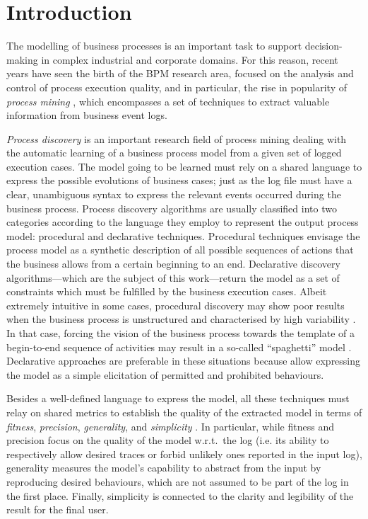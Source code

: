 
\section{Introduction}
\label{sec:intro}
The modelling of business processes is an important task to support decision-making in complex industrial and corporate domains. For this reason, recent years have seen the birth of the \ac{BPM} research area, focused on the analysis and control of process execution quality, and in particular, the rise in popularity of \emph{process mining} \cite{2012-Aalst}, which encompasses a set of techniques to extract valuable information from business event logs. 

\emph{Process discovery} is an important research field of process mining dealing with the automatic learning of a business process model from a given set of logged execution cases. 
The model going to be learned must rely on a shared language to express the possible evolutions of business cases; just as the log file must have a clear, unambiguous syntax to express the relevant events occurred during the business process. Process discovery algorithms are usually classified into two categories according to the language they employ to represent the output process model: procedural and declarative techniques.
Procedural techniques envisage the process model as a synthetic description of all possible sequences of actions that the business allows from a certain beginning to an end. Declarative discovery algorithms---which are the subject of this work---return the model as a set of constraints which must be fulfilled by the business execution cases. 
%
Albeit extremely intuitive in some cases, procedural discovery may show poor results when the business process is unstructured and characterised by high variability \cite{2009-Fahland}. 
In that case, forcing the vision of the business process towards the template of a begin-to-end sequence of activities may result in a so-called ``spaghetti'' model \cite{2018b-Maggi}. Declarative approaches are preferable in these situations because allow expressing the model as a simple elicitation of permitted and prohibited behaviours.

Besides a well-defined language to express the model, all these techniques must relay on shared metrics to establish the quality of the extracted model in terms of \emph{fitness}, \emph{precision}, \emph{generality}, and \emph{simplicity} \cite{2015-Adriansyah,2014-Broucke,2018-Ponce}. In particular, while fitness and precision focus on the quality of the model w.r.t.~the log (i.e. its ability to respectively allow desired traces or forbid unlikely ones reported in the input log), generality measures the model's capability to abstract from the input by reproducing desired behaviours, which are not assumed to be part of the log in the first place. Finally, simplicity is connected to the clarity and legibility of the result for the final user. 

